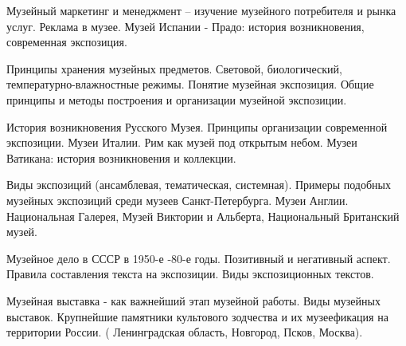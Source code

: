 \documentclass[
	14pt,
	a4paper,
	]
	{scrartcl}
\begin{document}
\vfill

\newpage


\shapk
{}
\setcounter{zad}{0}

\vfill
\z Музейный маркетинг и менеджмент – изучение музейного потребителя и рынка услуг. Реклама в музее.
 \vfill
\z Музей Испании - Прадо: история возникновения, современная экспозиция.
 \vfill

\vfill

\newpage


\shapk
{}
\setcounter{zad}{0}

\vfill
\z Принципы хранения музейных предметов. Световой, биологический, температурно-влажностные режимы. 
 \vfill
\z Понятие музейная экспозиция. Общие принципы и методы построения и организации музейной экспозиции.
 \vfill

\vfill

\newpage


\shapk
{}
\setcounter{zad}{0}

\vfill
\z История возникновения Русского Музея. Принципы организации современной экспозиции.
 \vfill
\z Музеи Италии. Рим как музей под открытым небом. Музеи Ватикана: история возникновения и коллекции.
 \vfill

\vfill

\newpage


\shapk
{}
\setcounter{zad}{0}

\vfill
\z Виды экспозиций (ансамблевая, тематическая, системная). Примеры подобных музейных экспозиций среди музеев Санкт-Петербурга.
 \vfill
\z Музеи Англии. Национальная Галерея, Музей Виктории и Альберта, Национальный Британский музей.
 \vfill

\vfill

\newpage


\shapk
{}
\setcounter{zad}{0}

\vfill
\z Музейное дело в СССР в 1950-е -80-е годы. Позитивный и негативный аспект. 
 \vfill
\z Правила составления текста на экспозиции. Виды экспозиционных текстов.
 \vfill

\vfill

\newpage


\shapk
{}
\setcounter{zad}{0}

\vfill
\z Музейная выставка - как важнейший этап музейной работы. Виды музейных выставок.
 \vfill
\z Крупнейшие памятники культового зодчества и их музеефикация на территории России. ( Ленинградская область, Новгород, Псков, Москва).
 \vfill
\end{document}
